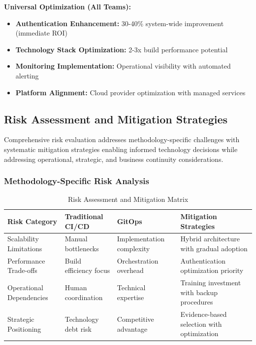 \textbf{Universal Optimization (All Teams):}
\begin{itemize}
\item \textbf{Authentication Enhancement:} 30-40\% system-wide improvement (immediate ROI)
\item \textbf{Technology Stack Optimization:} 2-3x build performance potential
\item \textbf{Monitoring Implementation:} Operational visibility with automated alerting
\item \textbf{Platform Alignment:} Cloud provider optimization with managed services
\end{itemize}

\subsection{Risk Assessment and Mitigation Strategies}
\label{subsec:risk_assessment}

Comprehensive risk evaluation addresses methodology-specific challenges with systematic mitigation strategies enabling informed technology decisions while addressing operational, strategic, and business continuity considerations.

\subsubsection{Methodology-Specific Risk Analysis}

\begin{table}[H]
\centering
\caption{Risk Assessment and Mitigation Matrix}
\label{tab:risk_matrix}
\begin{tabular}{|p{3cm}|p{3cm}|p{3cm}|p{4.5cm}|}
\hline
\textbf{Risk Category} & \textbf{Traditional CI/CD} & \textbf{GitOps} & \textbf{Mitigation Strategies} \\
\hline
Scalability Limitations & Manual bottlenecks & Implementation complexity & Hybrid architecture with gradual adoption \\
\hline
Performance Trade-offs & Build efficiency focus & Orchestration overhead & Authentication optimization priority \\
\hline
Operational Dependencies & Human coordination & Technical expertise & Training investment with backup procedures \\
\hline
Strategic Positioning & Technology debt risk & Competitive advantage & Evidence-based selection with optimization \\
\hline
\end{tabular}
\end{table}

